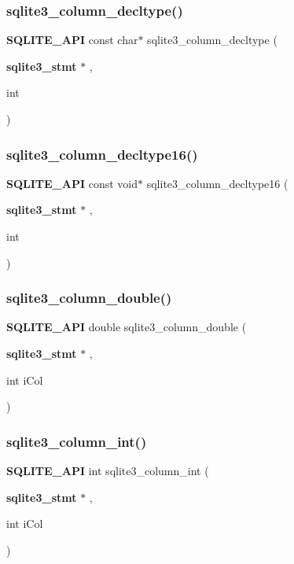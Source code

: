 \subsubsection{sqlite3\_column\_decltype()}
{\footnotesize\ttfamily \textbf{ S\+Q\+L\+I\+T\+E\+\_\+\+A\+PI} const char$\ast$ sqlite3\+\_\+column\+\_\+decltype (\begin{DoxyParamCaption}\item[{\textbf{ sqlite3\+\_\+stmt} $\ast$}]{,  }\item[{int}]{ }\end{DoxyParamCaption})}

\mbox{\label{sqlite3_8h_a73da44139548b1d8951c84ae59d3c12e}} 
\subsubsection{sqlite3\_column\_decltype16()}
{\footnotesize\ttfamily \textbf{ S\+Q\+L\+I\+T\+E\+\_\+\+A\+PI} const void$\ast$ sqlite3\+\_\+column\+\_\+decltype16 (\begin{DoxyParamCaption}\item[{\textbf{ sqlite3\+\_\+stmt} $\ast$}]{,  }\item[{int}]{ }\end{DoxyParamCaption})}

\mbox{\label{sqlite3_8h_a368632d32e55eaa325cb7272effffaba}} 
\subsubsection{sqlite3\_column\_double()}
{\footnotesize\ttfamily \textbf{ S\+Q\+L\+I\+T\+E\+\_\+\+A\+PI} double sqlite3\+\_\+column\+\_\+double (\begin{DoxyParamCaption}\item[{\textbf{ sqlite3\+\_\+stmt} $\ast$}]{,  }\item[{int}]{i\+Col }\end{DoxyParamCaption})}

\mbox{\label{sqlite3_8h_a6bd16f5b3266f473e37e8e3d4ebb4290}} 
\subsubsection{sqlite3\_column\_int()}
{\footnotesize\ttfamily \textbf{ S\+Q\+L\+I\+T\+E\+\_\+\+A\+PI} int sqlite3\+\_\+column\+\_\+int (\begin{DoxyParamCaption}\item[{\textbf{ sqlite3\+\_\+stmt} $\ast$}]{,  }\item[{int}]{i\+Col }\end{DoxyParamCaption})}

